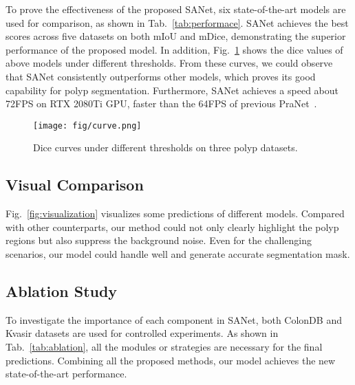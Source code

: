\documentclass[runningheads]{llncs}
\begin{document}
To prove the effectiveness of the proposed SANet, six state-of-the-art models are used for comparison, as shown in Tab.~\ref{tab:performace}. SANet achieves the best scores across five datasets on both mIoU and mDice, demonstrating the superior performance of the proposed model. In addition, Fig.~\ref{fig:dicecurve} shows the dice values of above models under different thresholds. From these curves, we could observe that SANet consistently outperforms other models, which proves its good capability for polyp segmentation. Furthermore, SANet achieves a speed about 72FPS on RTX 2080Ti GPU, faster than the 64FPS of previous PraNet~\cite{fan2020pranet}.

\begin{figure}[t]
  \centering
  \texttt{[image: fig/curve.png]}
  \caption{Dice curves under different thresholds on three polyp datasets.}
  \label{fig:dicecurve}
\end{figure}

\subsection{Visual Comparison}
Fig.~\ref{fig:visualization} visualizes some predictions of different models. Compared with other counterparts, our method could not only clearly highlight the polyp regions but also suppress the background noise. Even for the challenging scenarios, our model could handle well and generate accurate segmentation mask.

\subsection{Ablation Study}
To investigate the importance of each component in SANet, both ColonDB and Kvasir datasets are used for controlled experiments. As shown in Tab.~\ref{tab:ablation}, all the modules or strategies are  necessary for the final predictions. Combining all the proposed methods, our model achieves the new state-of-the-art performance.
\end{document}
